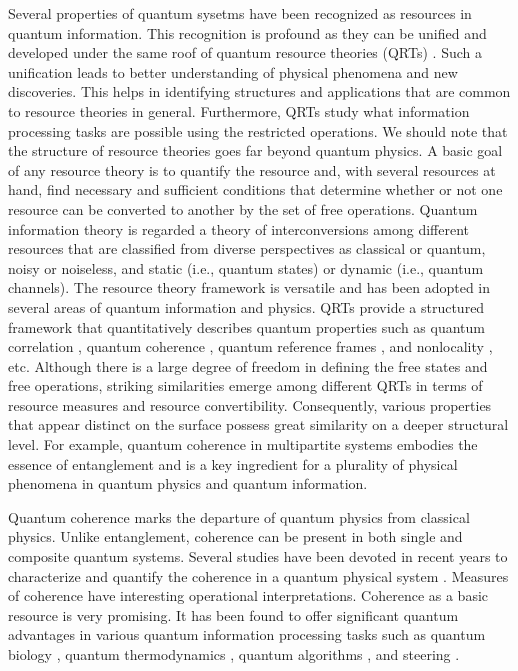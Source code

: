 \documentclass[american,aps,pra,reprint, superscriptaddress]{revtex4-1}
\theoremstyle{plain}
\theoremstyle{definition}
\theoremstyle{remark}
\begin{document}
Several properties of quantum sysetms have been recognized as resources in quantum information.
This recognition is profound as they can be unified and developed under the same
roof of quantum resource theories (QRTs) \cite{Chitambar, Brandao}.
Such a unification leads to better understanding of physical phenomena and new discoveries.
This helps in identifying structures and applications that are common to resource theories in general. Furthermore, QRTs study what information processing tasks are possible using the restricted operations.
We should note that the structure of resource theories goes far beyond quantum physics.
%
A basic goal of any resource theory is to quantify the resource and, with several resources at hand, find necessary and sufficient conditions that determine whether or not one resource can be converted to another by the set of free operations.
Quantum information theory is regarded a theory of interconversions among different resources  that are classified from diverse perspectives as classical or quantum, noisy or noiseless, and
static (i.e., quantum states) or dynamic (i.e., quantum channels).
%
The resource theory framework is versatile and has
been adopted in several areas of quantum information and physics.
QRTs provide a structured framework that quantitatively describes quantum properties such as quantum correlation \cite{Horodecki, Ollivier}, quantum coherence \cite{Streltsov1, Streltsov2}, quantum reference frames \cite{Bartlett, Gour}, and nonlocality \cite{Bell, Brunner}, etc.
%
Although there is a large degree of freedom in defining the free states and free operations, striking similarities emerge among different QRTs in terms of resource measures and resource convertibility. Consequently, various properties that appear distinct on the surface possess great similarity on a deeper structural level.
%
For example, quantum coherence in multipartite systems embodies the essence of entanglement and is a key ingredient for a plurality of physical phenomena in quantum physics and quantum information.

Quantum coherence marks the departure of quantum physics from classical physics.
Unlike entanglement, coherence can be present in both single and composite quantum systems.
Several studies have been devoted in recent years to characterize and quantify the coherence in a quantum physical system \cite{Baumgratz, Girolami, Lostaglio, Shao, Pires, Rana, Rastegin, Napoli, Yu, Luo, Bu, Xiong}. Measures of coherence have interesting operational interpretations.
%
Coherence as a basic resource is very promising. It has been found to offer significant quantum advantages in various quantum information processing tasks such as quantum biology \cite{Huelga}, quantum thermodynamics \cite{Mitchison, Kammerlander, Korzekwa}, quantum algorithms \cite{Hillery}, and steering \cite{Mondal}.
\end{document}
